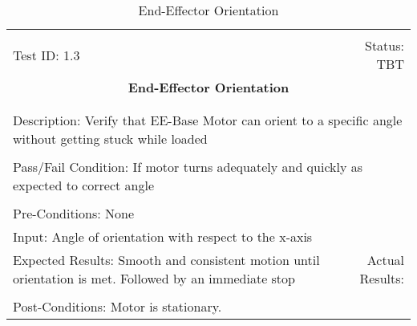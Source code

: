 \documentclass[titlepage]{article}
\begin{document}
\begin{center}%
\begin{table}
\begin{tabular}{|l r|}\hline&\\[-2mm]
	Test ID: 1.3	&Status: TBT\\[-3mm]
	\multicolumn{2}{|c|}{\textbf{\large{End-Effector Orientation}}}\\&\\\hline&\\[-3mm]
	\multicolumn{2}{|p{\textwidth}|}{Description: Verify that EE-Base Motor can orient to a specific angle without getting stuck while loaded}\\[1mm]\hline&\\[-3mm]
	\multicolumn{2}{|p{\textwidth}|}{Pass/Fail Condition: If motor turns adequately and quickly as expected to correct angle}\\[1mm]\hline&\\[-3mm]
	\multicolumn{2}{|p{\textwidth}|}{Pre-Conditions: None}\\[4mm]
	\multicolumn{2}{|p{\textwidth}|}{Input: Angle of orientation with respect to the x-axis}\\[2mm]\hline
	\multicolumn{1}{|p{0.49\textwidth}}{Expected Results: Smooth and consistent motion until orientation is met. Followed by an immediate stop}	&\multicolumn{1}{|p{0.45\textwidth}|}{Actual Results:}\\\hline&\\[-3mm]
	\multicolumn{2}{|p{\textwidth}|}{Post-Conditions: Motor is stationary.}\\\hline
\end{tabular}
\caption{End-Effector Orientation}
\end{table}
\end{center}
\end{document}
